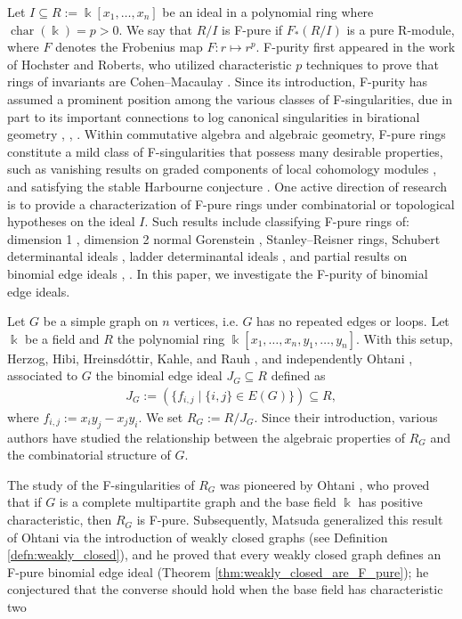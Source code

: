 \documentclass[12pt,a4paper]{amsart}
\theoremstyle{plain}
\theoremstyle{definition}
\theoremstyle{remark}
\def\k{\Bbbk}
\DeclareMathOperator{\fchar}{char}
\renewcommand{\subset}{\subseteq}
\begin{document}
Let $I \subset R := \k[x_{1},\ldots,x_{n}]$ be an ideal in a polynomial ring where $\fchar(\k) = p > 0$. We say that $R/I$ is F-pure if $F_{\ast}(R/I)$ is a pure R-module, where $F$ denotes the Frobenius map $F:r \mapsto r^p$. F-purity first appeared in the work of Hochster and Roberts, who utilized characteristic $p$ techniques to prove that rings of invariants are Cohen--Macaulay \cite{hochster1974rings}. Since its introduction, F-purity has assumed a prominent position among the various classes of F-singularities, due in part to its important connections to log canonical singularities in birational geometry \cite{hara2002f}, \cite{mustata2005FThresholds}, \cite{takagi2004fpure}. Within commutative algebra and algebraic geometry, F-pure rings constitute a mild class of F-singularities that possess many desirable properties, such as vanishing results on graded components of local cohomology modules \cite{hochster1976purity}, and satisfying the stable Harbourne conjecture \cite{grifo2019symbolic}. One active direction of research is to provide a characterization of F-pure rings under combinatorial or topological hypotheses on the ideal $I$. Such results include classifying F-pure rings of: dimension 1 \cite{goto1977structure}, dimension 2 normal Gorenstein \cite{watanabe1988study}, Stanley--Reisner rings, Schubert determinantal ideals \cite{brion2007frobenius}, ladder determinantal ideals \cite{de2023ladder}, and partial results on binomial edge ideals \cite{matsuda2018weakly}, \cite{ohtani2011graphs}. In this paper, we investigate the F-purity of binomial edge ideals.

Let $G$ be a simple graph on $n$ vertices, i.e. $G$ has no repeated edges or loops. Let $\k$ be a field and $R$ the polynomial ring $\k[x_{1},\ldots,x_{n},y_{1},\ldots,y_{n}]$. With this setup, Herzog, Hibi, Hreinsd\'{o}ttir, Kahle, and Rauh \cite{herzog2010binomial}, and independently Ohtani \cite{ohtani2011graphs}, associated to $G$ the binomial edge ideal $J_{G} \subset R$ defined as
\begin{align*}
    J_{G} := \left( \{ f_{i,j} \mid \{i,j\} \in E(G) \} \right) \subset R,
\end{align*}
where $f_{i,j} := x_{i}y_{j} - x_{j}y_{i}$. We set $R_{G} := R/J_{G}$. Since their introduction, various authors have studied the relationship between the algebraic properties of $R_{G}$ and the combinatorial structure of $G$. 

The study of the F-singularities of $R_{G}$ was pioneered by Ohtani \cite{ohtani2013binomial}, who proved that if $G$ is a complete multipartite graph and the base field $\k$ has positive characteristic, then $R_{G}$ is F-pure. Subsequently, Matsuda \cite{matsuda2018weakly} generalized this result of Ohtani via the introduction of weakly closed graphs (see Definition \ref{defn:weakly_closed}), and he proved
that every weakly closed  graph defines an F-pure binomial edge ideal (Theorem \ref{thm:weakly_closed_are_F_pure}); he conjectured that the converse should hold when the base field has characteristic two 
\end{document}
